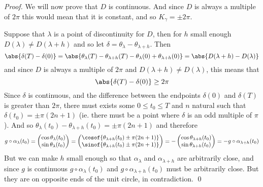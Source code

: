 \begin{proof}
    We will now prove that $D$ is continuous.
    And since $D$ is always a multiple of $2\pi$ this would mean that it is constant, and so $K_\gamma=\pm2\pi$.

    Suppose that $\lambda$ is a point of discontinuity for $D$, then for $h$ small enough $D(\lambda)\neq D(\lambda+h)$ and so let $\delta=\theta_\lambda-\theta_{\lambda+h}$.
    Then
    \[ \abs{\delta(T)-\delta(0)} = \abs{\theta_\lambda(T)-\theta_{\lambda+h}(T)-\theta_\lambda(0)+\theta_{\lambda+h}(0)} = \abs{D(\lambda+h)-D(\lambda)} \]
    and since $D$ is always a multiple of $2\pi$ and $D(\lambda+h)\neq D(\lambda)$, this means that
    \[ \abs{\delta(T)-\delta(0)} \geq 2\pi \]
    Since $\delta$ is continuous, and the difference between the endpoints $\delta(0)$ and $\delta(T)$ is greater than $2\pi$, there must exists some $0\leq t_0\leq T$ and $n$ natural such that
    $\delta(t_0)=\pm\pi(2n+1)$ (ie. there must be a point where $\delta$ is an odd multiple of $\pi$).
    And so $\theta_\lambda(t_0)-\theta_{\lambda+h}(t_0)=\pm\pi(2n+1)$ and therefore
    \[ g\circ\alpha_\lambda(t_0) = \pmat{\cos\theta_\lambda(t_0) \\ \sin\theta_\lambda(t_0)} = \pmat{\cosof{\theta_{\lambda+h}(t_0)\pm\pi(2n+1)}\\\sinof{\theta_{\lambda+h}(t_0)\pm\pi(2n+1)}} = 
    -\pmat{\cos\theta_{\lambda+h}(t_0)\\\sin\theta_{\lambda+h}(t_0)} = -g\circ\alpha_{\lambda+h}(t_0) \]
    But we can make $h$ small enough so that $\alpha_\lambda$ and $\alpha_{\lambda+h}$ are arbitrarily close, and since $g$ is continuous $g\circ\alpha_\lambda(t_0)$ and $g\circ\alpha_{\lambda+h}(t_0)$ must
    be arbitrarily close.
    But they are on opposite ends of the unit circle, in contradiction.
    \qed

\end{proof}


